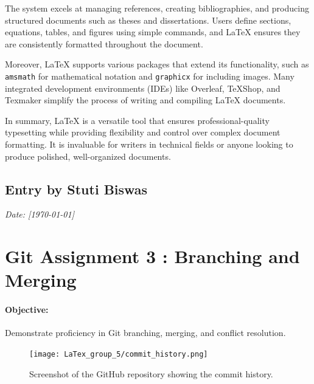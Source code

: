 \documentclass[12pt, a4paper]{article}
\begin{document}
The system excels at managing references, creating bibliographies, and producing structured documents such as theses and dissertations. Users define sections, equations, tables, and figures using simple commands, and LaTeX ensures they are consistently formatted throughout the document.

Moreover, LaTeX supports various packages that extend its functionality, such as \texttt{amsmath} for mathematical notation and \texttt{graphicx} for including images. Many integrated development environments (IDEs) like Overleaf, TeXShop, and Texmaker simplify the process of writing and compiling LaTeX documents.

\vspace{0.3cm} %

In summary, LaTeX is a versatile tool that ensures professional-quality typesetting while providing flexibility and control over complex document formatting. It is invaluable for writers in technical fields or anyone looking to produce polished, well-organized documents.


\newpage
{}
\vspace{-2cm}
\subsection*{Entry by Stuti Biswas}
\textit{Date: [\today]}\\
\section*{\Huge{Git Assignment 3 : Branching and Merging}}

\paragraph{Objective:} Demonstrate proficiency in Git branching, merging, and conflict resolution.

\vspace{0.5cm}

\begin{figure}[h!]
    \centering
    \texttt{[image: LaTex\_group\_5/commit\_history.png]} %
     \hspace{4 cm}
    \caption{Screenshot of the GitHub repository showing the commit history.}
\end{figure}
\end{document}

